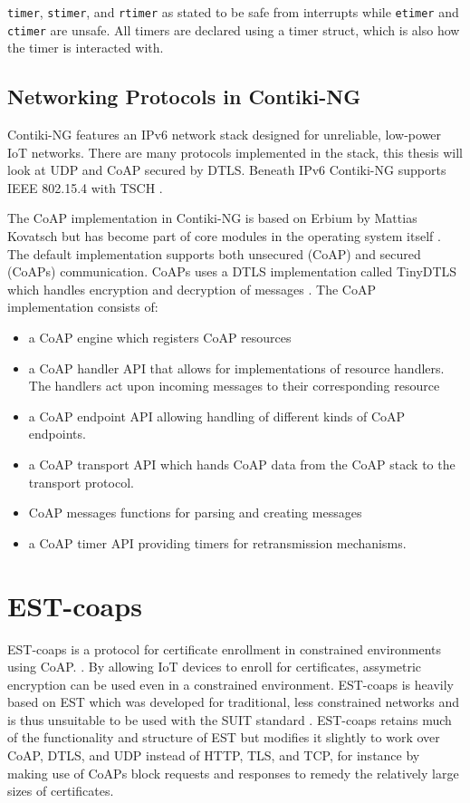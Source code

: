 \documentclass[0-thesis.tex]{subfiles}
\begin{document}
\texttt{timer}, \texttt{stimer}, and \texttt{rtimer} as stated to be safe from interrupts
while \texttt{etimer} and \texttt{ctimer} are unsafe. All timers are declared using a timer
struct, which is also how the timer is interacted with.

\subsection{Networking Protocols in Contiki-NG}
\label{ssec:networking-contiki}
Contiki-NG features an IPv6 network stack designed for unreliable, low-power IoT networks.
There are many protocols implemented in the stack, this thesis will look at UDP and CoAP
secured by DTLS. Beneath IPv6 Contiki-NG supports IEEE 802.15.4 with TSCH
\parencite{ieee-802.15.4}.

The CoAP implementation in Contiki-NG is based on Erbium by Mattias Kovatsch but has
become part of core modules in the operating system itself \parencite{low-power-coap}. The
default implementation supports both unsecured (CoAP) and secured (CoAPs) communication.
CoAPs uses a DTLS implementation called TinyDTLS which handles encryption and decryption
of messages \parencite{tinydtls-github}. The CoAP implementation consists of:

\begin{itemize}
    \item a CoAP engine which registers CoAP resources
    \item a CoAP handler API that allows for implementations of resource handlers. The
        handlers act upon incoming messages to their corresponding resource
    \item a CoAP endpoint API allowing handling of different kinds of CoAP endpoints.
    \item a CoAP transport API which hands CoAP data from the CoAP stack to the transport
    protocol.
    \item CoAP messages functions for parsing and creating messages
    \item a CoAP timer API providing timers for retransmission mechanisms.    
\end{itemize}


\section{EST-coaps}
\label{ssec:est-coaps}
EST-coaps is a protocol for certificate enrollment in constrained environments using CoAP.
\parencite{est-coaps}. By allowing IoT devices to enroll for certificates, assymetric
encryption can be used even in a constrained environment. EST-coaps is heavily based on
EST which was developed for traditional, less constrained networks and is thus unsuitable
to be used with the SUIT standard \parencite{rfc7030}. EST-coaps retains much of the
functionality and structure of EST but modifies it slightly to work over CoAP, DTLS, and
UDP instead of HTTP, TLS, and TCP, for instance by making use of CoAPs block requests and
responses to remedy the relatively large sizes of certificates.
\end{document}
